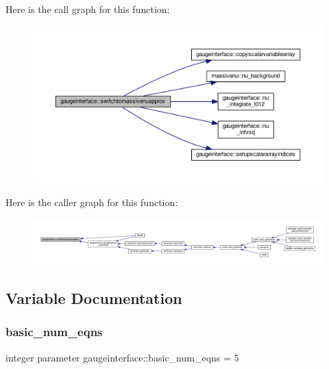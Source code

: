 Here is the call graph for this function\+:
\nopagebreak
\begin{figure}[H]
\begin{center}
\leavevmode
\includegraphics[width=350pt]{namespacegaugeinterface_ac7f67b6e2bc871b4eb1a6d3453f796a3_cgraph}
\end{center}
\end{figure}
Here is the caller graph for this function\+:
\nopagebreak
\begin{figure}[H]
\begin{center}
\leavevmode
\includegraphics[width=350pt]{namespacegaugeinterface_ac7f67b6e2bc871b4eb1a6d3453f796a3_icgraph}
\end{center}
\end{figure}


\subsection{Variable Documentation}
\mbox{\label{namespacegaugeinterface_a4ec8e34555b9492e02f9ca7793b37b7a}} 
\subsubsection{\texorpdfstring{basic\+\_\+num\+\_\+eqns}{basic\_num\_eqns}}
{\footnotesize\ttfamily integer parameter gaugeinterface\+::basic\+\_\+num\+\_\+eqns = 5}



